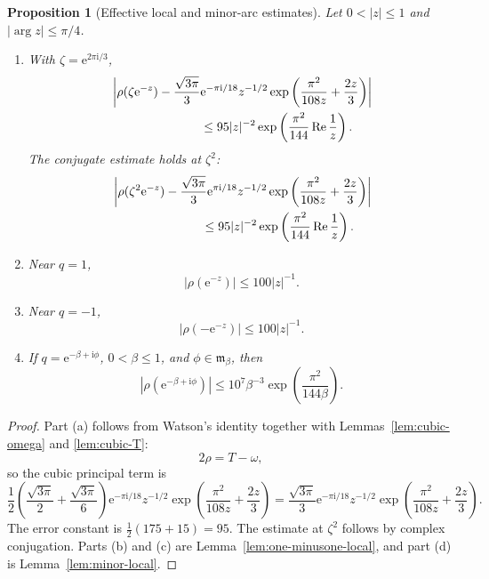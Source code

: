 \documentclass[11pt]{article}
\newtheorem{proposition}[theorem]{Proposition}
\theoremstyle{remark}
\newcommand{\ii}{\mathrm i}
\newcommand{\e}{\mathrm e}
\newcommand{\Repart}{\operatorname{Re}}
\begin{document}
\begin{proposition}[Effective local and minor-arc estimates]\label{prop:estimate-package}
Let $0<|z|\leq1$ and $|\arg z|\leq\pi/4$.

\begin{enumerate}[label=\textup{(\alph*)}]
\item With $\zeta=\e^{2\pi\ii/3}$,
\begin{align}\label{eq:cubic-est-zeta}
&\left|
\rho(\zeta\e^{-z})-
\frac{\sqrt{3\pi}}3\e^{-\pi\ii/18}z^{-1/2}
\exp\left(\frac{\pi^2}{108z}+\frac{2z}{3}\right)
\right|  \\
&\hspace{1.0in}\leq
95|z|^{-2}\exp\left(\frac{\pi^2}{144}\Repart\frac1z\right).
\end{align}
The conjugate estimate holds at $\zeta^2$:
\begin{align}\label{eq:cubic-est-zeta2}
&\left|
\rho(\zeta^2\e^{-z})-
\frac{\sqrt{3\pi}}3\e^{\pi\ii/18}z^{-1/2}
\exp\left(\frac{\pi^2}{108z}+\frac{2z}{3}\right)
\right| \\
&\hspace{1.0in}\leq
95|z|^{-2}\exp\left(\frac{\pi^2}{144}\Repart\frac1z\right).
\end{align}

\item Near $q=1$,
\[
|\rho(\e^{-z})|\leq100|z|^{-1}.
\]

\item Near $q=-1$,
\[
|\rho(-\e^{-z})|\leq100|z|^{-1}.
\]

\item If $q=\e^{-\beta+\ii\phi}$, $0<\beta\leq1$, and
$\phi\in\mathfrak m_\beta$, then
\[
|\rho(\e^{-\beta+\ii\phi})|
\leq10^7\beta^{-3}\exp\left(\frac{\pi^2}{144\beta}\right).
\]
\end{enumerate}
\end{proposition}

\begin{proof}
Part (a) follows from Watson's identity together with
Lemmas~\ref{lem:cubic-omega} and \ref{lem:cubic-T}:
\[
2\rho=T-\omega,
\]
so the cubic principal term is
\[
\frac12\left(\frac{\sqrt{3\pi}}2+\frac{\sqrt{3\pi}}6\right)
\e^{-\pi\ii/18}z^{-1/2}
\exp\left(\frac{\pi^2}{108z}+\frac{2z}{3}\right)
=
\frac{\sqrt{3\pi}}3\e^{-\pi\ii/18}z^{-1/2}
\exp\left(\frac{\pi^2}{108z}+\frac{2z}{3}\right).
\]
The error constant is $\frac12(175+15)=95$.  The estimate at $\zeta^2$ follows by
complex conjugation.  Parts (b) and (c) are Lemma~\ref{lem:one-minusone-local}, and
part (d) is Lemma~\ref{lem:minor-local}.
\end{proof}
\end{document}
